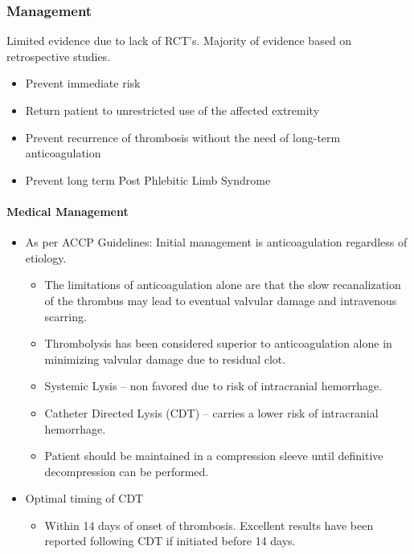 \documentclass[
]{book}
\providecommand{\tightlist}{%
  \setlength{\itemsep}{0pt}\setlength{\parskip}{0pt}}
\begin{document}
\hypertarget{management-11}{%
\subsubsection{Management}\label{management-11}}

Limited evidence due to lack of RCT's. Majority of evidence based on
retrospective studies.

\begin{itemize}
\item
  Prevent immediate risk
\item
  Return patient to unrestricted use of the affected extremity
\item
  Prevent recurrence of thrombosis without the need of long-term
  anticoagulation
\item
  Prevent long term Post Phlebitic Limb Syndrome
\end{itemize}

\hypertarget{medical-management}{%
\paragraph{Medical Management}\label{medical-management}}

\begin{itemize}
\item
  As per ACCP Guidelines: Initial management is anticoagulation
  regardless of etiology. \citep{kearonAntithromboticTherapyVTE2016}

  \begin{itemize}
  \item
    The limitations of anticoagulation alone are that the slow
    recanalization of the thrombus may lead to eventual valvular
    damage and intravenous scarring.
    \citep{sekharYearbookVascularEndovascular2018}
  \item
    Thrombolysis has been considered superior to anticoagulation
    alone in minimizing valvular damage due to residual clot.
    \citep{urschelSurgeryRemainsMost2008}
  \item
    Systemic Lysis -- non favored due to risk of intracranial
    hemorrhage. \citep{grunwaldCatheterDirectedThrombolysisTreatment2004}
  \item
    Catheter Directed Lysis (CDT) -- carries a lower risk of
    intracranial hemorrhage.
  \item
    Patient should be maintained in a compression sleeve until
    definitive decompression can be performed.
  \end{itemize}
\item
  Optimal timing of CDT

  \begin{itemize}
  \tightlist
  \item
    Within 14 days of onset of thrombosis. Excellent results have
    been reported following CDT if initiated before 14 days.
    \citep{wilsonFibrinolyticTherapyIdiopathic1990}
  \end{itemize}
\end{itemize}
\end{document}
